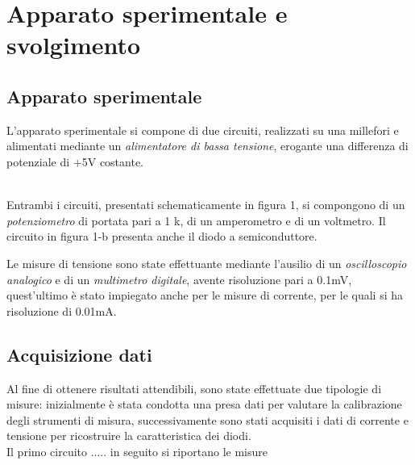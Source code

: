 \documentclass[@MAIN@]{subfiles}
\begin{document}
    \section{Apparato sperimentale e svolgimento} \label{sec:acquisizione}

    \subsection{Apparato sperimentale}\label{subsec:apparato-sperimentale}
    L'apparato sperimentale si compone di due circuiti, realizzati su una millefori
    e alimentati mediante un \textit{alimentatore di bassa tensione},
    erogante una differenza di potenziale di +5V costante.
    \\ \\
    
    \hfill
    
    \newpage
    Entrambi i circuiti, presentati schematicamente in figura 1, si compongono di
    un \textit{potenziometro} di portata pari a 1 k\textohm, di un amperometro e
    di un voltmetro.
    Il circuito in figura 1-b presenta anche il diodo a semiconduttore.

    Le misure di tensione sono state effettuante mediante l'ausilio di un
    \textit{oscilloscopio analogico} e di un \textit{multimetro digitale}, avente
    risoluzione pari a 0.1mV, quest'ultimo è stato impiegato anche per le misure
    di corrente, per le quali si ha risoluzione di 0.01mA.

    \subsection{Acquisizione dati}\label{subsec:acquisizione-dati}

    Al fine di ottenere risultati attendibili, sono state effettuate due tipologie
    di misure: inizialmente è stata condotta una presa dati per valutare la
    calibrazione degli strumenti di misura, successivamente sono stati acquisiti
    i dati di corrente e tensione per ricostruire la caratteristica dei diodi. \\

    Il primo circuito .....
    in seguito si riportano le misure
    \\ \\
    \begin{center}
        
    \end{center}


    \begin{minipage}{.45\textwidth}
        \centering
        
    \end{minipage}
    \hfill
    \begin{minipage}{.45\textwidth}
        \centering
        
    \end{minipage}
\end{document}
